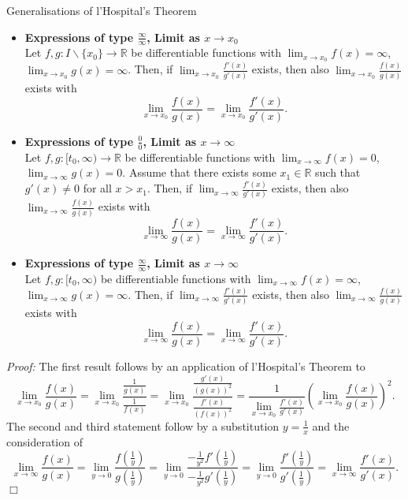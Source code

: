 
\begin{Theorem}{Generalisations of l'Hospital's Theorem}
\begin{itemize}
 \item \textbf{Expressions of type $\frac\infty\infty$, Limit as $x\to x_0$} \\
     Let $f,g:I\backslash\{x_0\}\to\mathbb{R}$ be differentiable functions with $\lim_{x\to x_0}f(x)=\infty$,  $\lim_{x\to x_0}g(x)=\infty$.
Then, if $\lim_{x\to x_0}\frac{f'(x)}{g'(x)}$ exists, then also $\lim_{x\to x_0}\frac{f(x)}{g(x)}$ exists with
\[\lim_{x\to x_0}\frac{f(x)}{g(x)}=\lim_{x\to x_0}\frac{f'(x)}{g'(x)}.\]
 \item \textbf{Expressions of type $\frac00$, Limit as $x\to\infty$}\\
     Let $f,g:[t_0,\infty)\to\mathbb{R}$ be differentiable functions with $\lim_{x\to \infty}f(x)=0$,  $\lim_{x\to \infty}g(x)=0$.
        Assume that there exists some $x_1\in\mathbb{R}$ such that $g'(x)\neq0$ for all $x>x_1$. Then, if $\lim_{x\to\infty}\frac{f'(x)}{g'(x)}$ exists, then also $\lim_{x\to\infty}\frac{f(x)}{g(x)}$ exists with
\[\lim_{x\to\infty}\frac{f(x)}{g(x)}=\lim_{x\to\infty}\frac{f'(x)}{g'(x)}.\]
\item \textbf{Expressions of type $\frac\infty\infty$, Limit as $x\to\infty$}\\
 Let $f,g:[t_0,\infty)$  be differentiable functions with $\lim_{x\to \infty}f(x)=\infty$,  $\lim_{x\to \infty}g(x)=\infty$.
Then, if $\lim_{x\to\infty}\frac{f'(x)}{g'(x)}$ exists, then also $\lim_{x\to\infty}\frac{f(x)}{g(x)}$ exists with
\[\lim_{x\to\infty}\frac{f(x)}{g(x)}=\lim_{x\to\infty}\frac{f'(x)}{g'(x)}.\]
\end{itemize}
\end{Theorem}
{\em Proof:} The first result follows by an application of l'Hospital's Theorem to
\[\lim_{x\to x_0}\frac{f(x)}{g(x)}=\lim_{x\to x_0}\frac{\frac1{g(x)}}{\frac1{f(x)}}=\lim_{x\to x_0}\frac{\frac{g'(x)}{(g(x))^2}}{\frac{f'(x)}{(f(x))^2}}=\frac1{\lim_{x\to x_0}\frac{f'(x)}{g'(x)}}\left(\lim_{x\to x_0}\frac{f(x)}{g(x)}\right)^2.\]
The second and third statement follow by a substitution $y=\frac1x$ and the consideration of
\[\lim_{x\to\infty}\frac{f(x)}{g(x)}=\lim_{y\to0}\frac{f\left(\frac1y\right)}{g\left(\frac1y\right)}
=\lim_{y\to0}\frac{-\frac1{y^2}f'\left(\frac1y\right)}{-\frac1{y^2}g'\left(\frac1y\right)}
=\lim_{y\to0}\frac{f'\left(\frac1y\right)}{g'\left(\frac1y\right)}
=\lim_{x\to\infty}\frac{f'(x)}{g'(x)}.\]
$\Box$


